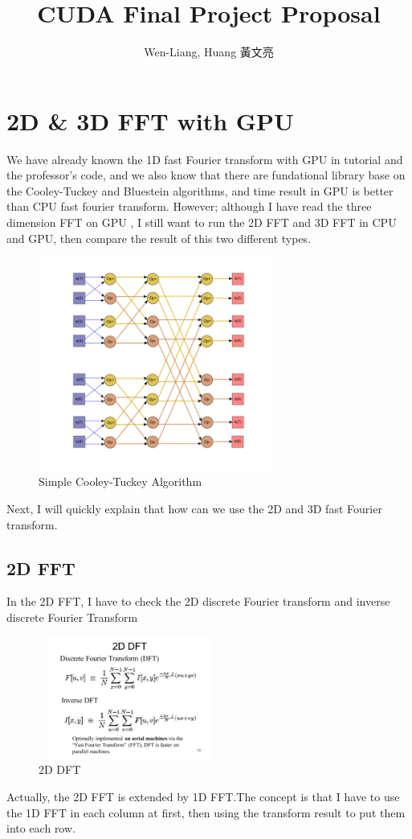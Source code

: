 \documentclass[]{article}
\title{CUDA Final Project Proposal}
\author{Wen-Liang, Huang 黃文亮}
\begin{document}
\maketitle

\section{2D \& 3D FFT with GPU}
We have already known the 1D fast Fourier transform\cite{FFT} with GPU in tutorial and the professor's code, and we also know that there are fundational library base on the Cooley-Tuckey\cite{Cooley-Tuckey} and Bluestein algorithms, and time result in GPU is better than CPU fast fourier transform. However; although I have read the three dimension FFT on GPU \cite{Keskin2017AnEP}, I still want to run the 2D FFT and 3D FFT in CPU and GPU, then compare the result of this two different types.

\begin{figure}[hbt!]
  \centering
  \includegraphics[height=7cm]{Cooley-Tukey_Fourier_Transform_algorithm}
  \caption{Simple Cooley-Tuckey Algorithm}
  \label{fig:mesh1}
\end{figure}

Next, I will quickly explain that how can we use the 2D and 3D fast Fourier transform.


\subsection{2D FFT}
In the 2D FFT, I have to check the 2D discrete Fourier transform and inverse discrete Fourier Transform
\begin{figure}[hbt!]
  \centering
  \includegraphics[width=6cm,height=4cm]{2D+DFT+Discrete+Fourier+Transform+(DFT)+Inverse+DFT}
  \caption{2D DFT}
\end{figure}
Actually, the 2D FFT is extended by 1D FFT.The concept is that I have to use the 1D FFT in each column at first, then using the transform result to put them into each row.
\end{document}
